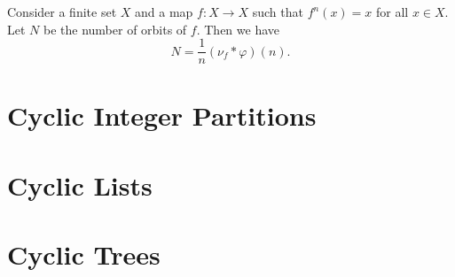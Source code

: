 \begin{theorem}
    Consider a finite set $X$ and a map $f:X\to X$ such that $f^n(x)=x$ for all $x\in X$. Let $N$ be the number of orbits of $f$. Then we have
  \begin{equation*}
    N=\frac{1}{n}(\nu_f\ast \varphi)(n).
  \end{equation*}
\end{theorem}

\section{Cyclic Integer Partitions}

\section{Cyclic Lists}

\section{Cyclic Trees}

